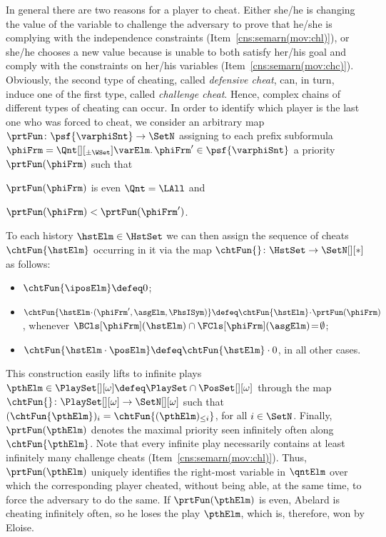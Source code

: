 \documentclass[authoryear]{elsarticle}
\begin{document}
In general there are two reasons for a player to cheat.
Either she/he is changing the value of the variable to challenge the adversary
to prove that he/she is complying with the independence constraints
(Item~\ref{cns:semarn(mov:chl)}), or she/he chooses a new value because is
unable to both satisfy her/his goal and comply with the constraints on her/his
variables (Item~\ref{cns:semarn(mov:chc)}).
Obviously, the second type of cheating, called \emph{defensive cheat}, can, in
turn, induce one of the first type, called \emph{challenge cheat}.
Hence, complex chains of different types of cheating can occur.
In order to identify which player is the last one who was forced to cheat, we
consider an arbitrary map $\prtFun \colon \psf{\varphiSnt} \to \SetN$ assigning
to each prefix subformula $\phiFrm = \Qnt[][_{\pm\WSet}] \varElm \ldotp \phiFrm'
\in \psf{\varphiSnt}$ a priority $\prtFun(\phiFrm)$ such that
\begin{inparaenum}[i)]
  \item
    $\prtFun(\phiFrm)$ is even \iff $\Qnt = \LAll$ and
  \item
    $\prtFun(\phiFrm) < \prtFun(\phiFrm')$.
\end{inparaenum}
To each history $\hstElm \in \HstSet$ we can then assign the sequence of cheats
$\chtFun{\hstElm}$ occurring in it via the map $\chtFun{} \colon \HstSet \to
\SetN[][*]$ as follows:
\begin{itemize}[$\bullet$]
  \item
    $\chtFun{\iposElm} \defeq 0$;
  \item
    $\chtFun{\hstElm \!\cdot\! (\phiFrm', \asgElm, \PhsISym)} \defeq
    \chtFun{\hstElm} \!\cdot\! \prtFun(\phiFrm)$, whenever
    $\BCls[\phiFrm](\hstElm) \cap \FCls[\phiFrm](\asgElm) \!=\! \emptyset$;
  \item
    $\chtFun{\hstElm \cdot \posElm} \defeq \chtFun{\hstElm} \cdot 0$, in all
    other cases.
\end{itemize}
This construction easily lifts to infinite plays $\pthElm \in \PlaySet[][\omega]
\defeq \PlaySet \cap \PosSet[][\omega]$ through the map $\chtFun{} \colon
\PlaySet[][\omega] \to \SetN[][\omega]$ such that $(\chtFun{\pthElm})_{i} =
\chtFun{(\pthElm)_{\leq i}}$, for all $i \in \SetN$.
Finally, $\prtFun(\pthElm)$ denotes the maximal priority seen infinitely often
along $\chtFun{\pthElm}$.
Note that every infinite play necessarily contains at least infinitely many
challenge cheats (Item~\ref{cns:semarn(mov:chl)}).
Thus, $\prtFun(\pthElm)$ uniquely identifies the right-most variable in
$\qntElm$ over which the corresponding player cheated, without being able, at
the same time, to force the adversary to do the same.
If $\prtFun(\pthElm)$ is even, Abelard is cheating infinitely often, so he loses
the play $\pthElm$, which is, therefore, won by Eloise.
\end{document}
